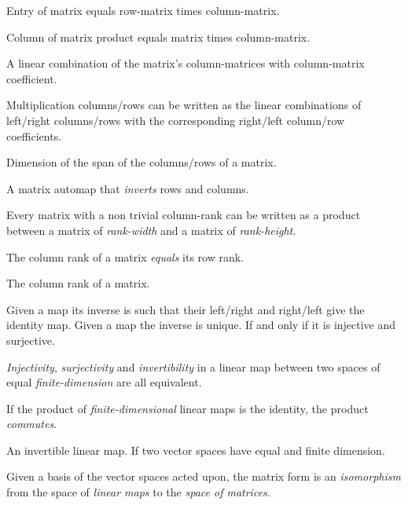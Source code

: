 \begin{multicols}{3}
  Entry of matrix equals row-matrix times column-matrix.

  Column of matrix product equals matrix times column-matrix.

  A linear combination of the matrix's column-matrices with
  column-matrix coefficient.

  Multiplication columns/rows can be written as the linear combinations of
  left/right columns/rows with
  the corresponding right/left column/row coefficients.
  
  Dimension of the span of the columns/rows of a matrix.

  A matrix automap that \textit{inverts} rows and columns.

  Every matrix with a non trivial column-rank
  can be written as a product between
  a matrix of \textit{rank-width} and a matrix of \textit{rank-height}.

  The column rank of a matrix \textit{equals} its row rank.

  The column rank of a matrix.

  Given a map its inverse is such that their left/right and right/left give the identity map.
  Given a map the inverse is unique.
  If and only if it is injective and surjective.

  \textit{Injectivity}, \textit{surjectivity} and \textit{invertibility} in a linear map between two spaces of equal \textit{finite-dimension} are all equivalent.

  If the product of \textit{finite-dimensional} linear maps is the identity, the product \textit{commutes}.

  An invertible linear map.
  If two vector spaces have equal and finite dimension.

  Given a basis of the vector spaces acted upon, the matrix form is an
  \textit{isomorphism} from the space of \textit{linear maps} to the \textit{space of matrices}.


\end{multicols}
